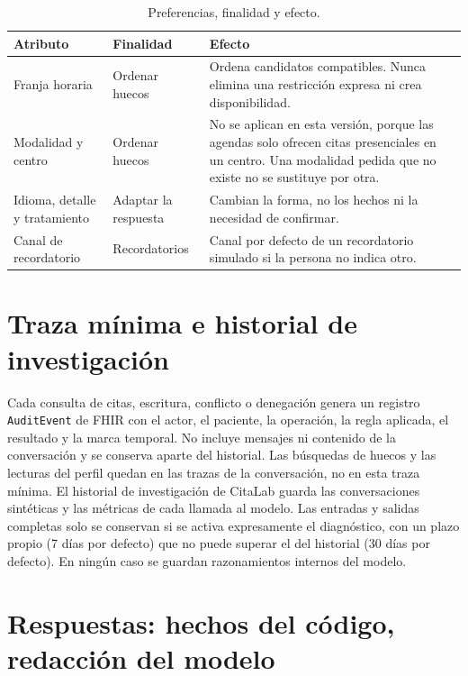 \begin{table}[!htbp]
\centering
\caption{Preferencias, finalidad y efecto.}
\label{tab:preferencias-alcance}
\small
\begin{tabularx}{\textwidth}{L{0.22\textwidth}L{0.22\textwidth}Y}
\toprule
\textbf{Atributo} & \textbf{Finalidad} & \textbf{Efecto} \\
\midrule
Franja horaria & Ordenar huecos & Ordena candidatos compatibles. Nunca elimina una restricción expresa ni crea disponibilidad. \\
Modalidad y centro & Ordenar huecos & No se aplican en esta versión, porque las agendas solo ofrecen citas presenciales en un centro. Una modalidad pedida que no existe no se sustituye por otra. \\
Idioma, detalle y tratamiento & Adaptar la respuesta & Cambian la forma, no los hechos ni la necesidad de confirmar. \\
Canal de recordatorio & Recordatorios & Canal por defecto de un recordatorio simulado si la persona no indica otro. \\
\bottomrule
\end{tabularx}
\end{table}

\section{Traza mínima e historial de investigación}

Cada consulta de citas, escritura, conflicto o denegación genera un registro
\texttt{AuditEvent} de FHIR con el actor, el paciente, la operación, la regla
aplicada, el resultado y la marca temporal. No incluye mensajes ni contenido de
la conversación y se conserva aparte del historial. Las búsquedas de huecos y
las lecturas del perfil quedan en las trazas de la conversación, no en esta
traza mínima. El historial de
investigación de CitaLab guarda las conversaciones sintéticas y las métricas de
cada llamada al modelo. Las entradas y salidas completas solo se conservan si
se activa expresamente el diagnóstico, con un plazo propio (7 días por defecto)
que no puede superar el del historial (30 días por defecto). En ningún caso se
guardan razonamientos internos del modelo.

\section{Respuestas: hechos del código, redacción del modelo}

